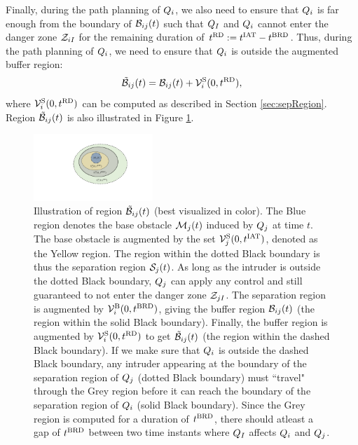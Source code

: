 Finally, during the path planning of $Q_i$, we also need to ensure that $Q_i$ is far enough from the boundary of $\mathcal{B}_{ij}(t)$ such that $Q_{I}$ and $Q_{i}$ cannot enter the danger zone $\mathcal{Z}_{iI}$ for the remaining duration of $t^\text{RD} := t^\text{IAT} - t^\text{BRD}$. Thus, during the path planning of $Q_i$, we need to ensure that $Q_i$ is outside the augmented buffer region:
\begin{equation} \label{eqn:augbuffRegion1}
\tilde{\buff}_{ij}(t) = \buff_{ij}(t) + \brs^{\text{S}}_{i}(0, \trd),
\end{equation}
where $\mathcal{V}^{\text{S}}_{i}(0, t^\text{RD})$ can be computed as described in Section \ref{sec:sepRegion}. Region $\tilde{\mathcal{B}}_{ij}(t)$ is also illustrated in Figure \ref{fig:buffRegion}.

\begin{figure}[H]
  \centering
  \includegraphics[width=0.4\textwidth]{"figs/buffRegion"}
  \caption{Illustration of region $\tilde{\mathcal{B}}_{ij}(t)$ (best visualized in color). The Blue region denotes the base obstacle $\mathcal{M}_j(t)$ induced by $Q_j$ at time $t$. The base obstacle is augmented by the set $\mathcal{V}^{\text{S}}_{j}(0, t^\text{IAT})$, denoted as the Yellow region. The region within the dotted Black boundary is thus the separation region $\mathcal{S}_j(t)$. As long as the intruder is outside the dotted Black boundary, $Q_j$ can apply any control and still guaranteed to not enter the danger zone $\mathcal{Z}_{jI}$. The separation region is augmented by $\mathcal{V}^{\text{B}}_{i}(0, t^\text{BRD})$, giving the buffer region $\mathcal{B}_{ij}(t)$ (the region within the solid Black boundary). Finally, the buffer region is augmented by $\mathcal{V}^{\text{S}}_{i}(0, t^\text{RD})$ to get $\tilde{\mathcal{B}}_{ij}(t)$ (the region within the dashed Black boundary). If we make sure that $Q_i$ is outside the dashed Black boundary, any intruder appearing at the boundary of the separation region of $Q_j$ (dotted Black boundary) must ``travel" through the Grey region before it can reach the boundary of the separation region of $Q_i$ (solid Black boundary). Since the Grey region is computed for a duration of $t^\text{BRD}$, there should atleast a gap of $t^\text{BRD}$ between two time instants where $Q_{I}$  affects $Q_i$ and $Q_j$.}
  \label{fig:buffRegion}
\end{figure}

